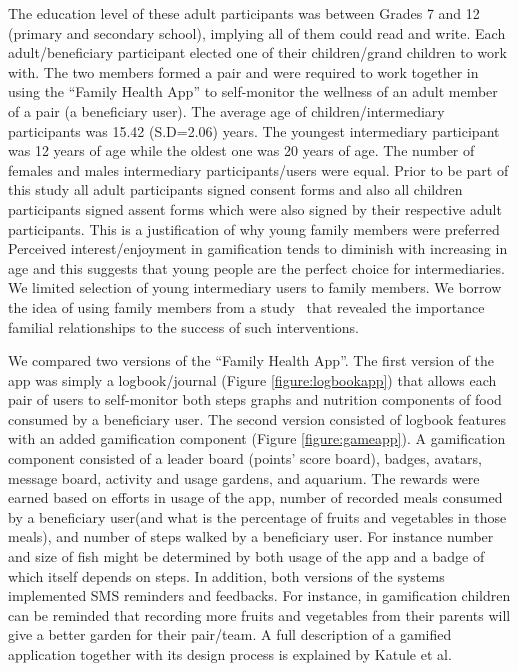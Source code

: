 \documentclass{sig-alternate}
\begin{document}
The education level of these adult participants was between Grades 7 and 12 (primary and secondary school), implying all of them could read and write. Each adult/beneficiary participant  elected one of their children/grand children to work with. The two members formed a pair and were required to work together in using the ``Family Health App'' to self-monitor the wellness of an adult member of a pair (a beneficiary user). The average age of children/intermediary participants was 15.42 (S.D=2.06) years. The youngest intermediary participant was 12 years of age while the oldest one was 20 years of age. The number of females and males intermediary participants/users were equal. Prior to be part of this study all adult participants signed consent forms and also all children participants signed assent forms which were also signed by their respective adult participants. This is a justification of why young family members were preferred Perceived interest/enjoyment in gamification tends to diminish with increasing in age \cite{v2014motivational} and this suggests that young people are the perfect choice for intermediaries. We limited selection of young intermediary users to family members. We borrow the idea of using family members from a study~\cite{katule2016:leveraging} that revealed the importance familial relationships to the success of such interventions. 

We compared two versions of the ``Family Health App''. The first version of the app was simply a logbook/journal (Figure \ref{figure:logbookapp}) that allows each pair of users to self-monitor both steps graphs and nutrition components of food consumed by a beneficiary user. The second version consisted of logbook features with an added gamification component (Figure \ref{figure:gameapp}). A gamification component consisted of a leader board (points' score board), badges, avatars, message board, activity and usage gardens, and aquarium. The rewards were earned based on efforts in usage of the app, number of recorded meals consumed by a beneficiary user(and what is the percentage of fruits and vegetables in those meals), and number of steps walked by a beneficiary user. For instance  number and size of fish might be determined by both usage of the app and a badge of which itself depends on steps.  In addition, both versions of the systems implemented SMS reminders and feedbacks. For instance, in gamification children can be reminded that recording more fruits and vegetables from their parents will give a better garden for their pair/team. A full description of a gamified application together with its design process is explained by Katule et al.~\cite{katule2016:leveraging}
\end{document}
